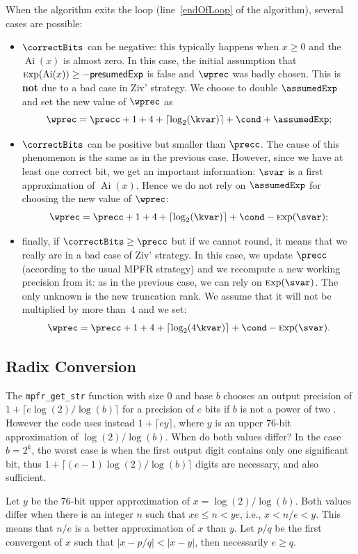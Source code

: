 \documentclass[12pt]{amsart}
\DeclareMathOperator{\Ai}{Ai}
\def\Exp{{\rm \textsc exp}}
\begin{document}
When the algorithm exits the loop (line~\ref{endOfLoop} of the algorithm), several cases are possible:
\begin{itemize}
\item $\correctBits$ can be negative: this typically happens when $x \ge 0$ and the $\Ai(x)$ is almost zero. In this case, the initial assumption that $\Exp(\Ai(x)) \ge -\mathsf{presumedExp}$ is false and $\wprec$ was badly chosen. This is \textbf{not} due to a bad case in Ziv' strategy. We choose to double $\assumedExp$ and set the new value of $\wprec$ as 
$$  \wprec = \precc + 1 + 4 + \lceil \log_2(\kvar)\rceil + \cond + \assumedExp;$$
\item $\correctBits$ can be positive but smaller than $\precc$. The cause of this phenomenon is the same as in the previous case. However, since we have at least one correct bit, we get an important information: $\svar$ is a first approximation of $\Ai(x)$. Hence we do not rely on $\assumedExp$ for choosing the new value of $\wprec$:
$$  \wprec = \precc + 1 + 4 + \lceil \log_2(\kvar)\rceil + \cond - \Exp(\svar);$$
\item finally, if $\correctBits \ge \precc$ but if we cannot round, it means that we really are in a bad case of Ziv' strategy. In this case, we update $\precc$ (according to the usual MPFR strategy) and we recompute a new working precision from it: as in the previous case, we can rely on $\Exp(\svar)$. The only unknown is the new truncation rank. We assume that it will not be multiplied by more than~$4$ and we set:
$$  \wprec = \precc + 1 + 4 + \lceil \log_2(4\kvar)\rceil + \cond - \Exp(\svar).$$
\end{itemize}

\subsection{Radix Conversion}

The \texttt{mpfr\_get\_str} function with size $0$ and base $b$ chooses an
output precision of $1 + \lceil e \log(2)/\log(b) \rceil$ for a precision
of $e$ bits if $b$ is not a power of two \cite{Mat68}.
However the code uses instead $1 + \lceil e y \rceil$, where $y$ is
an upper $76$-bit approximation of $\log(2)/\log(b)$. When do both values
differ?
In the case $b=2^k$, the worst case is when the first output digit contains
only one significant bit, thus
$1 + \lceil (e-1) \log(2)/\log(b) \rceil$ digits are necessary, and also
sufficient.

Let $y$ be the $76$-bit upper approximation of $x=\log(2)/\log(b)$.
Both values differ when there is an integer $n$ such that
$x e\leq n < y e$, i.e., $x < n/e < y$. This means that $n/e$ is a better
approximation of $x$ than $y$.
Let $p/q$ be the first convergent of $x$ such that $|x-p/q| < |x-y|$,
then necessarily $e \geq q$.
\end{document}
